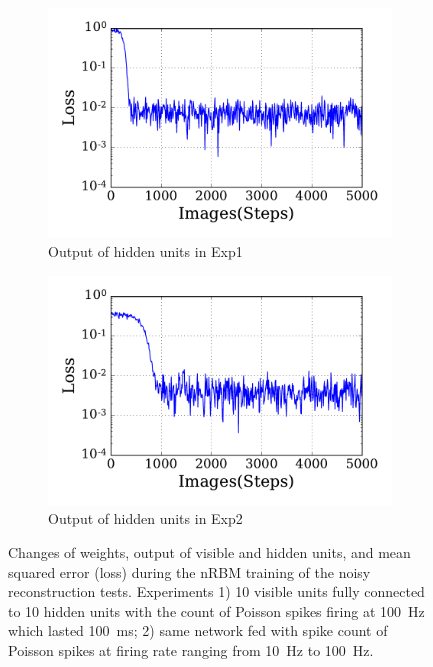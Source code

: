 \begin{figure}
\begin{subfigure}[t]{0.48\textwidth}
		\DIFaddendFL \includegraphics[width=\textwidth]{pics_sdlm/31_exp_RBM_noise/exp1_loss_s.pdf}
		\caption{Output of hidden units in Exp1}
	\end{subfigure}
	\DIFdelbeginFL %
\DIFdelendFL \DIFaddbeginFL \begin{subfigure}[t]{0.48\textwidth}
		\DIFaddendFL \includegraphics[width=\textwidth]{pics_sdlm/31_exp_RBM_noise/exp2_loss_s.pdf}
		\caption{Output of hidden units in Exp2}
	\end{subfigure}
	\caption{Changes of weights, output of visible and hidden units, and mean squared error (loss) during the nRBM training of the noisy reconstruction tests. 
		Experiments 1) 10 visible units fully connected to 10 hidden units with the count of Poisson spikes firing at 100~Hz which lasted 100~ms; 2) \DIFaddbeginFL {}\DIFaddendFL same network fed with spike count of Poisson spikes at firing rate ranging from 10~Hz to 100~Hz.}
	\label{fig:rbm_noise}
\end{figure}


